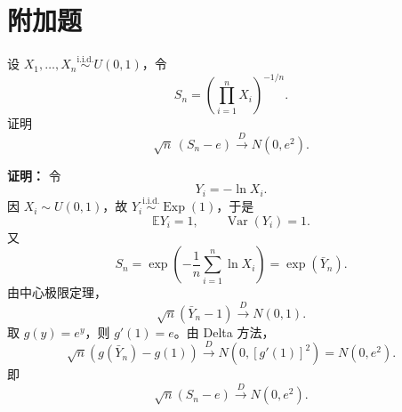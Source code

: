 \documentclass[UTF8,zihao=-4,fontset=windows]{ctexart}
\newcommand{\EX}{\mathbb E}
\newcommand{\Var}{\operatorname{Var}}
\newcommand{\iid}{\overset{\mathrm{i.i.d.}}{\sim}}
\newcommand{\Exp}{\operatorname{Exp}}
\newcommand{\ans}[1]{\textcolor{ansblue}{\textbf{#1}}}
\begin{document}
\section*{附加题}
设 $X_1,\ldots,X_n \iid U(0,1)$，令
\[
  S_n=\left(\prod_{i=1}^n X_i\right)^{-1/n}.
\]
证明
\[
  \sqrt n\,(S_n-e)\xrightarrow{D}N(0,e^2).
\]

\ans{证明：} 令
\[
  Y_i=-\ln X_i.
\]
因 $X_i\sim U(0,1)$，故 $Y_i\iid\Exp(1)$，于是
\[
  \EX Y_i=1,\qquad \Var(Y_i)=1.
\]
又
\[
  S_n=\exp\left(-\frac1n\sum_{i=1}^n\ln X_i\right)
      =\exp(\bar Y_n).
\]
由中心极限定理，
\[
  \sqrt n(\bar Y_n-1)\xrightarrow{D}N(0,1).
\]
取 $g(y)=e^y$，则 $g'(1)=e$。由 Delta 方法，
\[
  \sqrt n(g(\bar Y_n)-g(1))
  \xrightarrow{D}N(0,[g'(1)]^2)
  =N(0,e^2).
\]
即
\[
  \boxed{\sqrt n(S_n-e)\xrightarrow{D}N(0,e^2).}
\]
\end{document}
